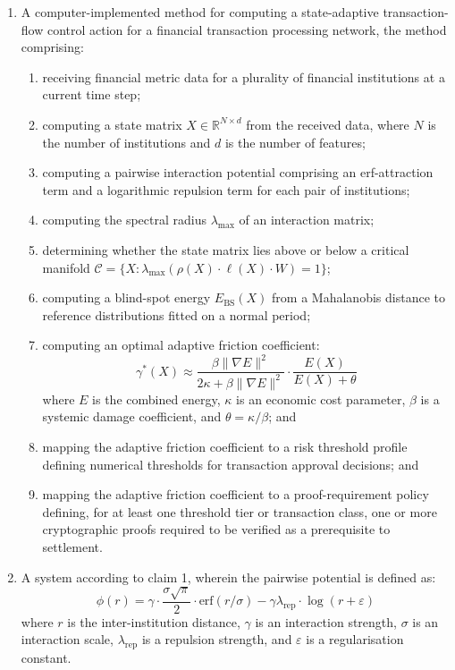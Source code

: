 \documentclass[12pt,a4paper]{article}
\begin{document}
\begin{enumerate}[label=\textbf{\arabic*.}]
\item A computer-implemented method for computing a state-adaptive 
transaction-flow control action for a financial transaction processing 
network, the method 
comprising:
\begin{enumerate}[label=(\alph*)]
\item receiving financial metric data for a plurality of financial 
institutions at a current time step;

\item computing a state matrix $X \in \mathbb{R}^{N \times d}$ from the 
received data, where $N$ is the number of institutions and $d$ is the 
number of features;

\item computing a pairwise interaction potential comprising an erf-attraction 
term and a logarithmic repulsion term for each pair of institutions;

\item computing the spectral radius $\lambda_{\max}$ of an interaction 
matrix;

\item determining whether the state matrix lies above or below a critical 
manifold $\mathcal{C} = \{X : \lambda_{\max}(\rho(X) \cdot \ell(X) \cdot 
W) = 1\}$;

\item computing a blind-spot energy $E_{\text{BS}}(X)$ from a Mahalanobis 
distance to reference distributions fitted on a normal period;

\item computing an optimal adaptive friction coefficient:
\[
\gamma^*(X) \approx \frac{\beta\|\nabla E\|^2}{2\kappa + 
\beta\|\nabla E\|^2} \cdot \frac{E(X)}{E(X) + \theta}
\]
where $E$ is the combined energy, $\kappa$ is an economic cost parameter, 
$\beta$ is a systemic damage coefficient, and $\theta = \kappa/\beta$; and

\item mapping the adaptive friction coefficient to a risk threshold profile 
defining numerical thresholds for transaction approval decisions; and
\item mapping the adaptive friction coefficient to a proof-requirement 
policy defining, for at least one threshold tier or transaction class, one 
or more cryptographic proofs required to be verified as a prerequisite to 
settlement.
\end{enumerate}

\item A system according to claim 1, wherein the pairwise potential is 
defined as:
\[
\phi(r) = \gamma \cdot \frac{\sigma\sqrt{\pi}}{2} \cdot 
\text{erf}(r/\sigma) - \gamma\lambda_{\text{rep}} \cdot 
\log(r + \varepsilon)
\]
where $r$ is the inter-institution distance, $\gamma$ is an interaction 
strength, $\sigma$ is an interaction scale, $\lambda_{\text{rep}}$ is a 
repulsion strength, and $\varepsilon$ is a regularisation constant.


\end{enumerate}
\end{document}

